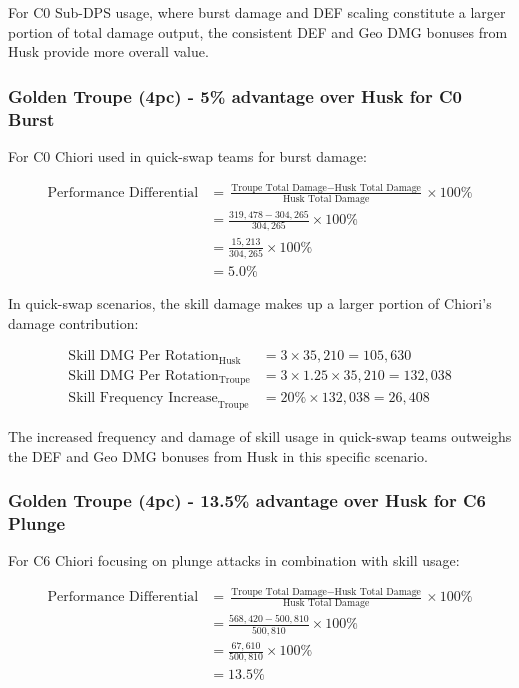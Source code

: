 \documentclass[12pt,a4paper]{article}
\begin{document}
For C0 Sub-DPS usage, where burst damage and DEF scaling constitute a larger portion of total damage output, the consistent DEF and Geo DMG bonuses from Husk provide more overall value.

\subsubsection{Golden Troupe (4pc) - 5\% advantage over Husk for C0 Burst}

For C0 Chiori used in quick-swap teams for burst damage:

\begin{align}
\text{Performance Differential} &= \frac{\text{Troupe Total Damage} - \text{Husk Total Damage}}{\text{Husk Total Damage}} \times 100\% \\
&= \frac{319,478 - 304,265}{304,265} \times 100\% \\
&= \frac{15,213}{304,265} \times 100\% \\
&= 5.0\%
\end{align}

In quick-swap scenarios, the skill damage makes up a larger portion of Chiori's damage contribution:

\begin{align}
\text{Skill DMG Per Rotation}_{\text{Husk}} &= 3 \times 35,210 = 105,630 \\
\text{Skill DMG Per Rotation}_{\text{Troupe}} &= 3 \times 1.25 \times 35,210 = 132,038 \\
\text{Skill Frequency Increase}_{\text{Troupe}} &= 20\% \times 132,038 = 26,408
\end{align}

The increased frequency and damage of skill usage in quick-swap teams outweighs the DEF and Geo DMG bonuses from Husk in this specific scenario.

\subsubsection{Golden Troupe (4pc) - 13.5\% advantage over Husk for C6 Plunge}

For C6 Chiori focusing on plunge attacks in combination with skill usage:

\begin{align}
\text{Performance Differential} &= \frac{\text{Troupe Total Damage} - \text{Husk Total Damage}}{\text{Husk Total Damage}} \times 100\% \\
&= \frac{568,420 - 500,810}{500,810} \times 100\% \\
&= \frac{67,610}{500,810} \times 100\% \\
&= 13.5\%
\end{align}
\end{document}
